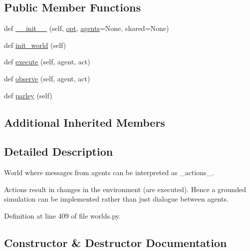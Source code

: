 \subsection*{Public Member Functions}
\begin{DoxyCompactItemize}
\item 
def \hyperlink{classparlai_1_1core_1_1worlds_1_1ExecutableWorld_a53d0974884562c0c2f92727dcc5a811b}{\+\_\+\+\_\+init\+\_\+\+\_\+} (self, \hyperlink{classparlai_1_1core_1_1worlds_1_1World_a3640d92718acd3e6942a28c1ab3678bd}{opt}, \hyperlink{classparlai_1_1core_1_1worlds_1_1MultiAgentDialogWorld_a05fc93525cb86edef121980fc55f9926}{agents}=None, shared=None)
\item 
def \hyperlink{classparlai_1_1core_1_1worlds_1_1ExecutableWorld_a8bb31ec1d93a94cb261f89ce0992159a}{init\+\_\+world} (self)
\item 
def \hyperlink{classparlai_1_1core_1_1worlds_1_1ExecutableWorld_a318fbf7c75178f62a6d46647f1a063fa}{execute} (self, agent, act)
\item 
def \hyperlink{classparlai_1_1core_1_1worlds_1_1ExecutableWorld_a69934ec2181a8b22269e02ab8b3bb1f2}{observe} (self, agent, act)
\item 
def \hyperlink{classparlai_1_1core_1_1worlds_1_1ExecutableWorld_a6555592d2b7c316e72febc1fccf43bdb}{parley} (self)
\end{DoxyCompactItemize}
\subsection*{Additional Inherited Members}


\subsection{Detailed Description}
\begin{DoxyVerb}World where messages from agents can be interpreted as _actions_.

Actions result in changes in the environment (are executed). Hence a grounded
simulation can be implemented rather than just dialogue between agents.
\end{DoxyVerb}
 

Definition at line 409 of file worlds.\+py.



\subsection{Constructor \& Destructor Documentation}
\mbox{\label{classparlai_1_1core_1_1worlds_1_1ExecutableWorld_a53d0974884562c0c2f92727dcc5a811b}} 
